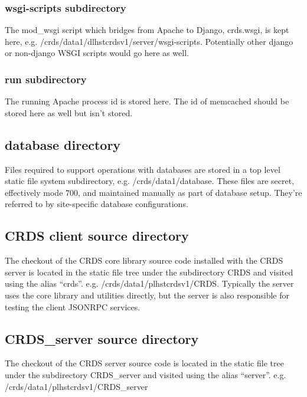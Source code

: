 \documentclass[letterpaper,10pt,english]{sphinxmanual}
\begin{document}
\subsubsection{wsgi-scripts subdirectory}
\label{server_guide:wsgi-scripts-subdirectory}
The mod\_wsgi script which bridges from Apache to Django,  crds.wsgi,  is kept here,
e.g. /crds/data1/dlhstcrdsv1/server/wsgi-scripts.  Potentially other django or non-django WSGI scripts
would go here as well.


\subsubsection{run subdirectory}
\label{server_guide:run-subdirectory}
The running Apache process id is stored here.   The id of memcached should be stored here as well but isn't stored.


\subsection{database directory}
\label{server_guide:database-directory}
Files required to support operations with databases are stored in a top level static file system
subdirectory,  e.g. /crds/data1/database.   These files are secret,  effectively mode 700, and maintained
manually as part of database setup.  They're referred to by site-specific database configurations.


\subsection{CRDS client source directory}
\label{server_guide:crds-client-source-directory}
The checkout of the CRDS core library source code installed with the CRDS server is located in the static file tree
under the subdirectory CRDS and visited using the alias ``crds''.  e.g.  /crds/data1/plhstcrdsv1/CRDS.  Typically
the server uses the core library and utilities directly,  but the server is also responsible for testing the client
JSONRPC services.


\subsection{CRDS\_server source directory}
\label{server_guide:crds-server-source-directory}
The checkout of the CRDS server source code is located in the static file tree under the subdirectory CRDS\_server
and visited using the alias ``server''.  e.g. /crds/data1/plhstcrdsv1/CRDS\_server
\end{document}
